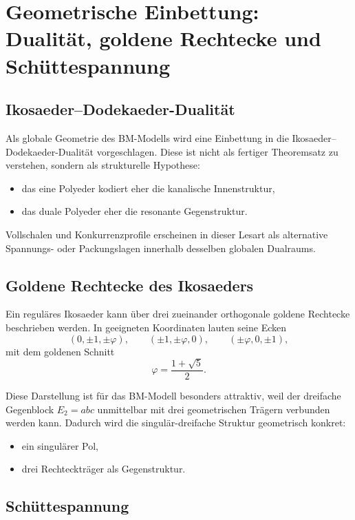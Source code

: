 \documentclass[11pt,a4paper]{article}
\theoremstyle{definition}
\theoremstyle{plain}
\begin{document}
	\section{Geometrische Einbettung: Dualität, goldene Rechtecke und Schüttespannung}
	
	\subsection{Ikosaeder--Dodekaeder-Dualität}
	
	Als globale Geometrie des BM-Modells wird eine Einbettung in die Ikosaeder--Dodekaeder-Dualität vorgeschlagen. Diese ist nicht als fertiger Theoremsatz zu verstehen, sondern als strukturelle Hypothese:
	\begin{itemize}[leftmargin=2em]
		\item das eine Polyeder kodiert eher die kanalische Innenstruktur,
		\item das duale Polyeder eher die resonante Gegenstruktur.
	\end{itemize}
	
	Vollschalen und Konkurrenzprofile erscheinen in dieser Lesart als alternative Spannungs- oder Packungslagen innerhalb desselben globalen Dualraums.
	
	\subsection{Goldene Rechtecke des Ikosaeders}
	
	Ein reguläres Ikosaeder kann über drei zueinander orthogonale goldene Rechtecke beschrieben werden. In geeigneten Koordinaten lauten seine Ecken
	\[
	(0,\pm 1,\pm \varphi),
	\qquad
	(\pm 1,\pm \varphi,0),
	\qquad
	(\pm \varphi,0,\pm 1),
	\]
	mit dem goldenen Schnitt
	\[
	\varphi=\frac{1+\sqrt5}{2}.
	\]
	
	Diese Darstellung ist für das BM-Modell besonders attraktiv, weil der dreifache Gegenblock $E_2=abc$ unmittelbar mit drei geometrischen Trägern verbunden werden kann. Dadurch wird die singulär-dreifache Struktur geometrisch konkret:
	\begin{itemize}[leftmargin=2em]
		\item ein singulärer Pol,
		\item drei Rechteckträger als Gegenstruktur.
	\end{itemize}
	
	\subsection{Schüttespannung}
	
\end{document}
